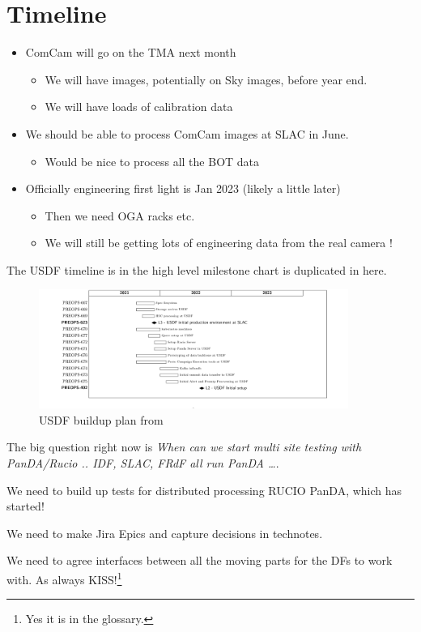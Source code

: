 \section{Timeline}


\begin{itemize}
\item ComCam will go on the TMA next month
	\begin{itemize}
	\item We will have images, potentially on Sky images, before year end.
	\item We will have loads of calibration data
	\end{itemize}
\item We should be able to process ComCam images at SLAC in June.
	\begin{itemize}
	\item Would be nice to process all the BOT data
	\end{itemize}
\item Officially engineering first light is Jan 2023 (likely a little later)
	\begin{itemize}
	\item Then we need OGA racks etc.
	\item We will still be getting lots of engineering data from the real camera !
	\end{itemize}
\end{itemize}

The USDF timeline is in  the high level milestone chart is duplicated in here.


\begin{figure}
\begin{centering}
\includegraphics[width=0.9\textwidth]{USDFplan}
	\caption{USDF buildup plan from \label{fig:usdfplan}}
\end{centering}
\end{figure}

The big question right now is {\em When can we start multi site testing with PanDA/Rucio ..
IDF, SLAC, FRdF all run PanDA \ldots}.

We need to build up tests for distributed processing RUCIO PanDA, which has started!


We need to make Jira Epics and capture decisions in technotes.

We need to agree interfaces between all the moving parts for the DFs to work with.
As always KISS!\footnote{Yes it is in the glossary.}


